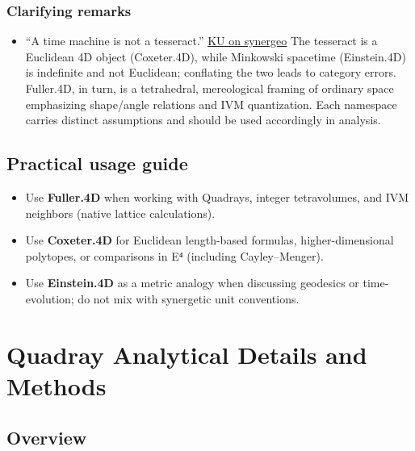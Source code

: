 \documentclass[
  10pt,
]{article}
\providecommand{\tightlist}{%
  \setlength{\itemsep}{0pt}\setlength{\parskip}{0pt}}
\begin{document}
\hypertarget{clarifying-remarks}{%
\subsubsection{Clarifying remarks}\label{clarifying-remarks}}

\begin{itemize}
\tightlist
\item
  ``A time machine is not a tesseract.''
  \href{https://groups.io/g/synergeo/topic/my_take_on_close_pack/114531919}{KU
  on synergeo} The tesseract is a Euclidean 4D object (Coxeter.4D),
  while Minkowski spacetime (Einstein.4D) is indefinite and not
  Euclidean; conflating the two leads to category errors. Fuller.4D, in
  turn, is a tetrahedral, mereological framing of ordinary space
  emphasizing shape/angle relations and IVM quantization. Each namespace
  carries distinct assumptions and should be used accordingly in
  analysis.
\end{itemize}

\hypertarget{practical-usage-guide}{%
\subsection{Practical usage guide}\label{practical-usage-guide}}

\begin{itemize}
\tightlist
\item
  Use \textbf{Fuller.4D} when working with Quadrays, integer
  tetravolumes, and IVM neighbors (native lattice calculations).
\item
  Use \textbf{Coxeter.4D} for Euclidean length-based formulas,
  higher-dimensional polytopes, or comparisons in E⁴ (including
  Cayley--Menger).
\item
  Use \textbf{Einstein.4D} as a metric analogy when discussing geodesics
  or time-evolution; do not mix with synergetic unit conventions.
\end{itemize}

\newpage

\hypertarget{quadray-analytical-details-and-methods}{%
\section{Quadray Analytical Details and
Methods}\label{quadray-analytical-details-and-methods}}

\hypertarget{overview}{%
\subsection{Overview}\label{overview}}
\end{document}
